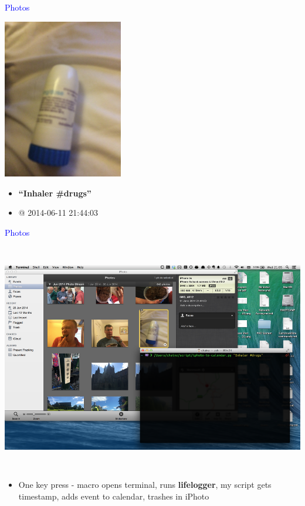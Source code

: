 \documentclass[landscape]{slides}
\begin{document}
\begin{slide}

    \textcolor{blue}{\Large{Photos}}

    \begin{center}
        \includegraphics[height=7cm,angle=270]{lifelog-photo-inhaler}
    \end{center}

    \begin{itemize}
        \item \textbf{``Inhaler \#drugs''}
        \item @ 2014-06-11 21:44:03
    \end{itemize}

\end{slide}



\begin{slide}

    \textcolor{blue}{\Large{Photos}}

    \begin{center}
        \includegraphics[height=10cm]{lifelog-iphoto-converter}
    \end{center}

    \begin{itemize}
        \item One key press - macro opens terminal, runs \textbf{lifelogger}, my script gets timestamp, adds event to calendar, trashes in iPhoto

    \end{itemize}

\end{slide}
\end{document}
